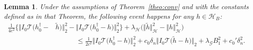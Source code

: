 \documentclass[twoside,11pt]{article}
\newtheorem{lemma}{Lemma}
\newcommand{\mc}{\mathcal}
\begin{document}
\begin{lemma} Under the assumptions of Theorem~\ref{theo:conv} and with the constants defined as in that Theorem, the following event happens for any $h\in \mc{H}_{B}$:
\begin{align*}
    \frac{1}{4c^2}\Big\{\big\Vert I_0 \mc{T} \big(h_0^\dag-&\tilde h\big)\big\Vert^2_2-\big\Vert I_0\mc{T} \big(h_0^\dag-h\big)\big\Vert^2_2\Big\}+\lambda_{\mc{H}}\Big(\big\Vert \tilde h\big\Vert_{\mc{H}}^2-\big\Vert h\big\Vert_{\mc{H}}^2\Big)\\
     &\quad\quad\quad\le \frac{1}{2c^2}\big\Vert I_0\mc{T} \big(h_0^\dag-h\big)\big\Vert^2_2+c_0\delta_n\big\Vert  I_0\mc{T}\big(\tilde h-h\big)\big\Vert_2+\lambda_{\mc{G}}B_1^2+c_0'\delta^2_n.
\end{align*}
\label{lemma:erm}
\end{lemma}
\end{document}
